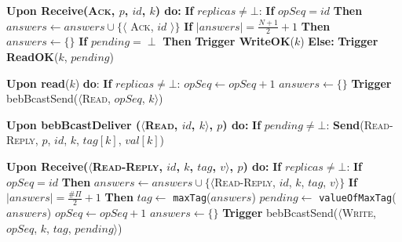 \documentclass[10pt,a4paper,twocolumn]{article}
\begin{document}
\begin{algorithm}
\begin{algorithmic}
					\State \textbf{Upon Receive(\textsc{Ack}, $p$, $id$, $k$) do:}
					\State \hspace{1em} \textbf{If} \textsc{$replicas \neq \bot$}:
					\State \hspace{3em} \textbf{If} $opSeq = id$ \textbf{Then}
					\State \hspace{4em} $answers \leftarrow answers \cup \{\langle$ \textsc{Ack}, $id$ $\rangle\}$
					\State \hspace{4em} \textbf{If} $|answers| = \frac{N+1}{2} + 1$ \textbf{Then}
					\State \hspace{5em} $answers \leftarrow \{\}$
					\State \hspace{5em} \textbf{If} $pending = \perp$ \textbf{Then}
					\State \hspace{6em} \textbf{Trigger WriteOK}($k$)
					\State \hspace{5em} \textbf{Else:}
					\State \hspace{6em} \textbf{Trigger ReadOK}($k$, \textbf{$pending$})
					\State

					\State \textbf{Upon read}($k$) \textbf{do}:
					\State \hspace{1em} \textbf{If} \textsc{$replicas \neq \bot$}:
					\State \hspace{3em} $opSeq \leftarrow opSeq + 1$
					\State \hspace{3em} $answers \leftarrow \{\}$
					\State \hspace{3em} \textbf{Trigger} bebBcastSend($\langle$\textsc{Read}, $opSeq$, $k$$\rangle$)
				\State

				\State \textbf{Upon bebBcastDeliver ($\langle$\textsc{Read}, $id$, $k$$\rangle$, $p$) do:}
				\State \hspace{1em} \textbf{If} \textsc{$pending \neq \bot$}:
				\State \hspace{3em} \textbf{Send}(\textsc{Read-Reply}, $p$, $id$, $k$, $tag[k]$, $val[k]$)
				\State

				\State \textbf{Upon Receive($\langle$\textsc{Read-Reply}, $id$, $k$, $tag$, $v$$\rangle$, $p$) do:}
				\State \hspace{1em} \textbf{If} \textsc{$replicas \neq \bot$}:
				\State \hspace{3em} \textbf{If} $opSeq = id$ \textbf{Then}
				\State \hspace{4em} $answers \leftarrow answers \cup \{\langle$\textsc{Read-Reply}, $id$, $k$, $tag$, $v$$\rangle\}$
					\State \hspace{4em} \textbf{If} $|answers| = \frac{\#\Pi}{2} + 1$ \textbf{Then}
					\State \hspace{5em} $tag \leftarrow$ \texttt{maxTag}($answers$)
					\State \hspace{5em} $pending \leftarrow$ \texttt{valueOfMaxTag}($answers$)
					\State \hspace{5em} $opSeq \leftarrow opSeq + 1$
					\State \hspace{5em} $answers \leftarrow \{\}$
					\State \hspace{5em} \textbf{Trigger} bebBcastSend($\langle$\textsc{Write}, $opSeq$, $k$, $tag$, $pending$$\rangle$)
	\end{algorithmic}
\end{algorithm}
\end{document}

